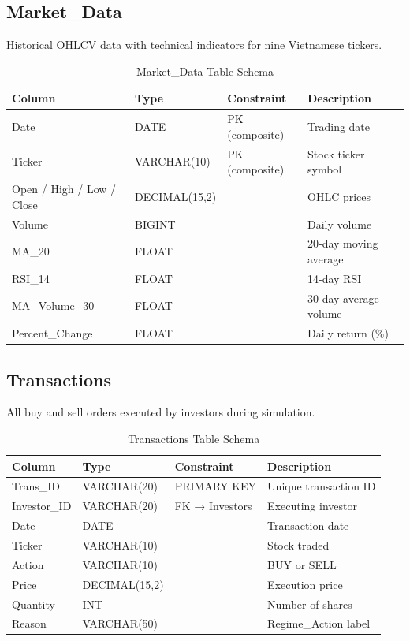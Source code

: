 \subsection{Market\_Data}

Historical OHLCV data with technical indicators for nine Vietnamese tickers.

\begin{table}[H]
    \centering
    \caption{Market\_Data Table Schema}
    \begin{tabular}{llll}
        \toprule
        \textbf{Column} & \textbf{Type} & \textbf{Constraint} & \textbf{Description} \\
        \midrule
        Date & DATE & PK (composite) & Trading date \\
        Ticker & VARCHAR(10) & PK (composite) & Stock ticker symbol \\
        Open / High / Low / Close & DECIMAL(15,2) & & OHLC prices \\
        Volume & BIGINT & & Daily volume \\
        MA\_20 & FLOAT & & 20-day moving average \\
        RSI\_14 & FLOAT & & 14-day RSI \\
        MA\_Volume\_30 & FLOAT & & 30-day average volume \\
        Percent\_Change & FLOAT & & Daily return (\%) \\
        \bottomrule
    \end{tabular}
\end{table}

\subsection{Transactions}

All buy and sell orders executed by investors during simulation.

\begin{table}[H]
    \centering
    \caption{Transactions Table Schema}
    \begin{tabular}{llll}
        \toprule
        \textbf{Column} & \textbf{Type} & \textbf{Constraint} & \textbf{Description} \\
        \midrule
        Trans\_ID & VARCHAR(20) & PRIMARY KEY & Unique transaction ID \\
        Investor\_ID & VARCHAR(20) & FK → Investors & Executing investor \\
        Date & DATE & & Transaction date \\
        Ticker & VARCHAR(10) & & Stock traded \\
        Action & VARCHAR(10) & & BUY or SELL \\
        Price & DECIMAL(15,2) & & Execution price \\
        Quantity & INT & & Number of shares \\
        Reason & VARCHAR(50) & & Regime\_Action label \\
        \bottomrule
    \end{tabular}
\end{table}

